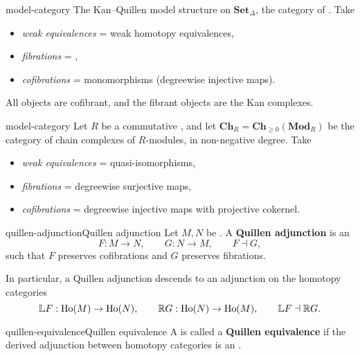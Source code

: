 \begin{example}{model-category}
    The Kan--Quillen model structure on $\textbf{Set}_\Delta$, the category of . Take
    \begin{itemize}
        \item \textit{weak equivalences} = weak homotopy equivalences,
        \item \textit{fibrations} = ,
        \item \textit{cofibrations} = monomorphisms (degreewise injective maps).
    \end{itemize}
    All objects are cofibrant, and the fibrant objects are the Kan complexes.
\end{example}

\begin{example}{model-category}
    Let $R$ be a commutative , and let $\textbf{Ch}_R = \textbf{Ch}_{\ge 0}(\textbf{Mod}_R)$ be the category of chain complexes of $R$-modules, in non-negative degree. Take
    \begin{itemize}
        \item \textit{weak equivalences} = quasi-isomorphisms,
        \item \textit{fibrations} = degreewise surjective maps,
        \item \textit{cofibrations} = degreewise injective maps with projective cokernel.
    \end{itemize}
\end{example}

\begin{topic}{quillen-adjunction}{Quillen adjunction}
    Let $M, N$ be . A \textbf{Quillen adjunction} is an 
    \[ F : M \to N, \qquad G : N \to M, \qquad F \dashv G , \]
    such that $F$ preserves cofibrations and $G$ preserves fibrations.
    
    In particular, a Quillen adjunction descends to an adjunction on the homotopy categories
    \[ \mathbb{L} F : \textup{Ho}(M) \to \textup{Ho}(N), \qquad \mathbb{R} G : \textup{Ho}(N) \to \textup{Ho}(M), \qquad \mathbb{L} F \dashv \mathbb{R} G . \]
\end{topic}

\begin{topic}{quillen-equivalence}{Quillen equivalence}
    A  is called a \textbf{Quillen equivalence} if the derived adjunction between homotopy categories is an .
\end{topic}

